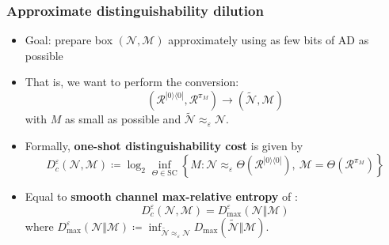 \documentclass[usenames,dvipsnames,handout]{beamer}
\begin{document}
\begin{frame}
\frametitle{Approximate distinguishability dilution}

\begin{itemize}

\pause
\item Goal: prepare box $(\mathcal{N}  ,\mathcal{M})$ approximately using as few bits of AD as possible

\pause
\item That is, we want to perform the conversion:
$$
(\mathcal{R}^{|0\rangle\!\langle 0 |}, \mathcal{R}^{\pi_M}) \rightarrow  (\widetilde{\mathcal{N}}  ,\mathcal{M}) 
$$
with $M$ as small as possible and $\widetilde{\mathcal{N}} \approx_{\varepsilon} \mathcal{N}$.

\pause
\item Formally, {\color{MidnightBlue}\textbf{one-shot distinguishability cost}}  is given by
$$
D_{c}^{\varepsilon}(\mathcal{N},\mathcal{M})\coloneqq 
\log_{2}\inf_{\Theta\in\text{SC}}\left\{  M:
\mathcal{N}
\approx_{\varepsilon} \Theta(\mathcal{R}^{|0\rangle\!\langle 0 |}),\ \mathcal{M}=\Theta(\mathcal{R}^{\pi_M})\right\}
$$

\pause
\item Equal to {\color{MidnightBlue}\textbf{smooth channel max-relative entropy}} of \cite{GFWRSCW18}:
$$
D_{c}^{\varepsilon}(\mathcal{N},\mathcal{M})=D_{\max}^{\varepsilon}(\mathcal{N}\Vert\mathcal{M})
$$
where $D_{\max}^{\varepsilon}(\mathcal{N}\Vert\mathcal{M})    \coloneqq \inf_{\widetilde{\mathcal{N}} \approx_{\varepsilon} \mathcal{N}}D_{\max}(\widetilde{\mathcal{N}} \Vert \mathcal{M})$.

\end{itemize}

\end{frame}
\end{document}
